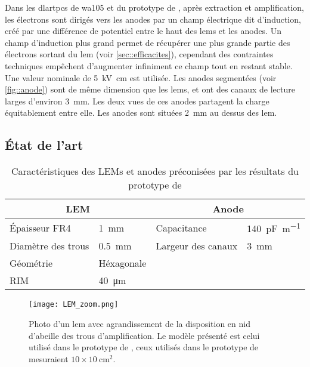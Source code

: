       Dans les \glspl{dlartpc} de \gls{wa105} et du prototype de \threeL{}, après extraction et amplification, les électrons sont dirigés vers les anodes par un champ électrique dit d'induction, créé par une différence de potentiel entre le haut des \glspl{lem} et les anodes. Un champ d'induction plus grand permet de récupérer une plus grande partie des électrons sortant du \gls{lem} (voir \autoref{sec::efficacites}), cependant des contraintes techniques empêchent d'augmenter infiniment ce champ tout en restant stable. Une valeur nominale de \SI{5}{\kilo\volt\centi\meter} est utilisée. Les anodes segmentées (voir \autoref{fig::anode}) sont de même dimension que les \glspl{lem}, et ont des canaux de lecture larges d'environ \SI{3}{\milli\meter}. Les deux vues de ces anodes partagent la charge équitablement entre elle. Les anodes sont situées \SI{2}{\milli\meter} au dessus des \gls{lem}.

    \subsection{État de l'art}\label{sec::state_of_the_art}

      \begin{table}[]
        \centering
        \begin{tabular}{|ll||ll|}
          \hline
          \multicolumn{2}{|c||}{LEM} & \multicolumn{2}{c|}{Anode} \\ \hline \hline
          Épaisseur FR4 & \SI{1}{\milli\meter} & Capacitance & \SI{140}{\pico\farad\per\meter} \\
          Diamètre des trous & \SI{0.5}{\milli\meter} & Largeur des canaux & \SI{3}{\milli\meter} \\
          Géométrie & Héxagonale &  &  \\
          RIM & \SI{40}{\micro\meter} &  &  \\ \hline
        \end{tabular}
        \caption[Caractéristiques des LEMs et anodes utilisé dans le \threeL{}]{\label{tab::lem_anode}Caractéristiques des LEMs et anodes préconisées par les résultats du prototype de \threeL{}}
      \end{table}

      \begin{figure}[htbp]
        \centering
        \texttt{[image: LEM\_zoom.png]} 
        \caption[Photo d'un amplificateur d'électron.]{Photo d'un \gls{lem} avec agrandissement de la disposition en nid d'abeille des trous d'amplification. Le modèle présenté est celui utilisé dans le prototype de \TOO{}, ceux utilisés dans le prototype de \threeL{} mesuraient $10\times\SI{10}{\centi\meter\squared}$.}
        \label{fig::lem}
      \end{figure}

